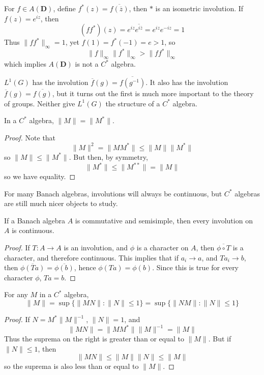 \begin{example}
    For $f \in A(\mathbf{D})$, define $f^*(z) = \overline{f(\overline{z})}$, then $*$ is an isometric involution. If $f(z) = e^{iz}$, then
    \[ (ff^*)(z) = e^{iz} \overline{e^{i\overline{z}}} = e^{iz} e^{-iz} = 1 \]
    Thus $\| f f^* \|_\infty = 1$, yet $f(1) = f^*(-1) = e > 1$, so
    \[ \| f \|_\infty \| f^* \|_\infty > \| ff^* \|_\infty \]
    which implies $A(\mathbf{D})$ is not a $C^*$ algebra.
\end{example}

\begin{example}
    $L^1(G)$ has the involution $\overline{f}(g) = \overline{f(g^{-1})}$. It also has the involution $\overline{f}(g) = \overline{f(g)}$, but it turns out the first is much more important to the theory of groups. Neither give $L^1(G)$ the structure of a $C^*$ algebra.
\end{example}

\begin{prop}
    In a $C^*$ algebra, $\| M \| = \| M^* \|$.
\end{prop}
\begin{proof}
    Note that
    \[ \| M \|^2 = \| M M^* \| \leq \| M \| \| M^* \| \]
    so $\| M \| \leq \| M^* \|$. But then, by symmetry,
    \[ \| M^* \| \leq \| M^{**} \| = \| M \| \]
    so we have equality.
\end{proof}

For many Banach algebras, involutions will always be continuous, but $C^*$ algebras are still much nicer objects to study.

\begin{prop}
    If a Banach algebra $A$ is commutative and semisimple, then every involution on $A$ is continuous.
\end{prop}
\begin{proof}
    If $T: A \to A$ is an involution, and $\phi$ is a character on $A$, then $\overline{\phi \circ T}$ is a character, and therefore continuous. This implies that if $a_i \to a$, and $Ta_i \to b$, then $\overline{\phi(Ta)} = \overline{\phi(b)}$, hence $\phi(Ta) = \phi(b)$. Since this is true for every character $\phi$, $Ta = b$.
\end{proof}

\begin{prop}
    For any $M$ in a $C^*$ algebra,
    \[ \| M \| = \sup \{ \| MN \| : \| N \| \leq 1 \} = \sup \{ \| NM \| : \| N \| \leq 1 \} \]
\end{prop}
\begin{proof}
    If $N = M^* \|M\|^{-1}$, $\| N \| = 1$, and
    \[ \| MN \| = \| MM^* \| \| M \|^{-1} = \| M \| \]
    Thus the suprema on the right is greater than or equal to $\| M \|$. But if $\| N \| \leq 1$, then
    \[ \| MN \| \leq \| M \| \| N \| \leq \| M \| \]
    so the suprema is also less than or equal to $\| M \|$.
\end{proof}


